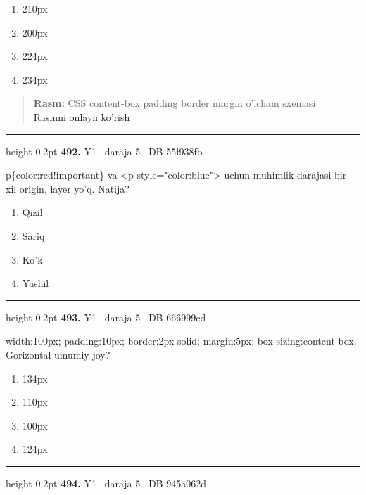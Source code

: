 \documentclass[10pt,a4paper,oneside]{article}
\begin{document}
\begin{enumerate}[label=\Alph*),leftmargin=9mm]
\item 210px
\item 200px
\item 224px
\item 234px
\end{enumerate}
\begin{quote}\footnotesize\color{muted}\textbf{Rasm:} CSS content-box padding border margin o'lcham sxemasi\\
\href{https://github.com/sarvar9417/attestatsiya/blob/main/public/graphics-web-v2/css_box.svg}{Rasmni onlayn ko'rish}
\end{quote}
\vspace{2mm}\hrule height 0.2pt \vspace{4mm}
\hypertarget{q492}{\textbf{\color{ink}492.}}  {\color{muted}\scriptsize Y1 \textbullet\ daraja 5 \textbullet\ DB 55f938fb}
\par
p\{color:red!important\} va \textless{}p style="color:blue"\textgreater{} uchun muhimlik darajasi bir xil origin, layer yo'q. Natija?
\begin{enumerate}[label=\Alph*),leftmargin=9mm]
\item Qizil
\item Sariq
\item Ko'k
\item Yashil
\end{enumerate}
\vspace{2mm}\hrule height 0.2pt \vspace{4mm}
\hypertarget{q493}{\textbf{\color{ink}493.}}  {\color{muted}\scriptsize Y1 \textbullet\ daraja 5 \textbullet\ DB 666999cd}
\par
width:100px; padding:10px; border:2px solid; margin:5px; box-sizing:content-box. Gorizontal umumiy joy?
\begin{enumerate}[label=\Alph*),leftmargin=9mm]
\item 134px
\item 110px
\item 100px
\item 124px
\end{enumerate}
\vspace{2mm}\hrule height 0.2pt \vspace{4mm}
\hypertarget{q494}{\textbf{\color{ink}494.}}  {\color{muted}\scriptsize Y1 \textbullet\ daraja 5 \textbullet\ DB 945a062d}
\par
\end{document}
